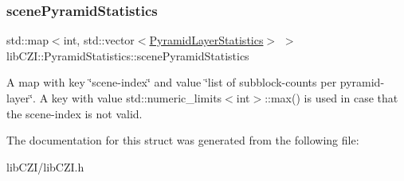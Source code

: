 \subsubsection{\texorpdfstring{scene\+Pyramid\+Statistics}{scenePyramidStatistics}}
{\footnotesize\ttfamily std\+::map$<$int, std\+::vector$<$\hyperlink{structlib_c_z_i_1_1_pyramid_statistics_1_1_pyramid_layer_statistics}{Pyramid\+Layer\+Statistics}$>$ $>$ lib\+C\+Z\+I\+::\+Pyramid\+Statistics\+::scene\+Pyramid\+Statistics}

A map with key \char`\"{}scene-\/index\char`\"{} and value \char`\"{}list of subblock-\/counts per pyramid-\/layer\char`\"{}. A key with value std\+::numeric\+\_\+limits$<$int$>$\+::max() is used in case that the scene-\/index is not valid. 

The documentation for this struct was generated from the following file\+:\begin{DoxyCompactItemize}
\item 
lib\+C\+Z\+I/lib\+C\+Z\+I.\+h\end{DoxyCompactItemize}
